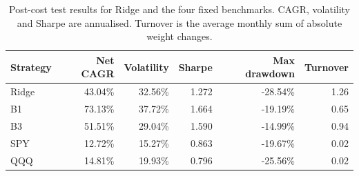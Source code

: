 \begin{table}[H]
\centering
\begin{tabular}{lrrrrr}
\toprule
Strategy & Net CAGR & Volatility & Sharpe & Max drawdown & Turnover \\
\midrule
Ridge & 43.04\% & 32.56\% & 1.272 & -28.54\% & 1.26 \\
B1 & 73.13\% & 37.72\% & 1.664 & -19.19\% & 0.65 \\
B3 & 51.51\% & 29.04\% & 1.590 & -14.99\% & 0.94 \\
SPY & 12.72\% & 15.27\% & 0.863 & -19.67\% & 0.02 \\
QQQ & 14.81\% & 19.93\% & 0.796 & -25.56\% & 0.02 \\
\bottomrule
\end{tabular}
\caption{Post-cost test results for Ridge and the four fixed benchmarks. CAGR, volatility and Sharpe are annualised. Turnover is the average monthly sum of absolute weight changes.}
\label{tab:oos}
\end{table}
